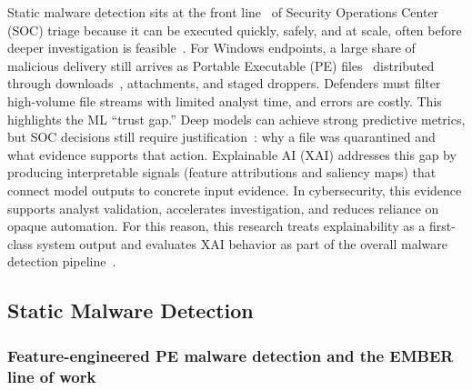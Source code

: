 \documentclass[conference]{IEEEtran}
\begin{document}
Static malware detection sits at the front line~\cite{KBSSSK2025} of Security Operations Center (SOC) triage because it can be executed quickly, safely, and at scale, often before deeper investigation is feasible~\cite{GPH2024}.
For Windows endpoints, a large share of malicious delivery still arrives as Portable Executable (PE) files~\cite{opentext2025} distributed through downloads~\cite{recordedfuture2025malware}, attachments, and staged droppers.
Defenders must filter high-volume file streams with limited analyst time, and errors are costly.
This highlights the ML ``trust gap.''
Deep models can achieve strong predictive metrics, but SOC decisions still require justification~\cite{NSDSP2025}: why a file was quarantined and what evidence supports that action.
Explainable AI (XAI) addresses this gap by producing interpretable signals (feature attributions and saliency maps) that connect model outputs to concrete input evidence.
In cybersecurity, this evidence supports analyst validation, accelerates investigation, and reduces reliance on opaque automation.
For this reason, this research treats explainability as a first-class system output and evaluates XAI behavior as part of the overall malware detection pipeline~\cite{SCDVPB2017,LL2017}.

\subsection{Static Malware Detection}
\subsubsection{Feature-engineered PE malware detection and the EMBER line of work}
\end{document}
